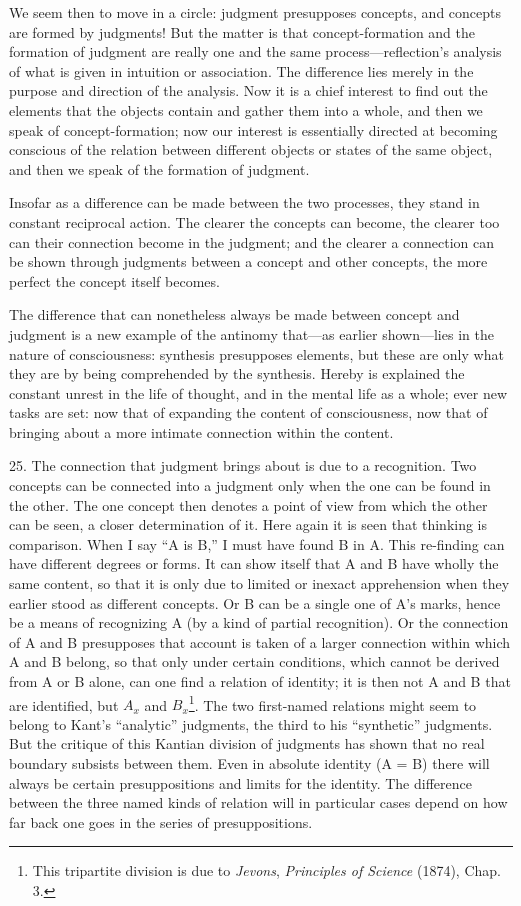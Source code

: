\documentclass[12pt,a4paper]{book}
\newcommand{\opage}[1]{\marginnote{\footnotesize\textit{[#1]}}}
\begin{document}
We seem then to move in a circle: judgment presupposes concepts, and
concepts are formed by judgments! But the matter is that concept-formation
and the formation of judgment are really one and the same
process---reflection's analysis of what is given in intuition or
association. The difference lies merely in the purpose and direction of
the analysis. Now it is a chief interest to find out the elements that
the objects contain and gather them into a whole, and then we speak of
concept-formation; now our interest is essentially directed at becoming
conscious of the relation between different objects or states of the same
object, and then we speak of the formation of judgment.

Insofar as a difference can be made between the two processes, they stand
in constant reciprocal action. The clearer the concepts can become, the
clearer too can their connection become in the judgment; and the clearer
a connection can be shown through judgments between a concept and other
concepts, the more perfect the concept itself becomes.

The difference that can nonetheless always be made between concept and
\opage{73}judgment is a new example of the antinomy that---as earlier shown---lies
in the nature of consciousness: synthesis presupposes elements, but these
are only what they are by being comprehended by the synthesis. Hereby is
explained the constant unrest in the life of thought, and in the mental
life as a whole; ever new tasks are set: now that of expanding the content
of consciousness, now that of bringing about a more intimate connection
within the content.

25. The connection that judgment brings about is due to a recognition.
Two concepts can be connected into a judgment only when the one can be
found in the other. The one concept then denotes a point of view from
which the other can be seen, a closer determination of it. Here again it
is seen that thinking is comparison. When I say ``A is B,'' I must have
found B in A. This re-finding can have different degrees or forms. It can
show itself that A and B have wholly the same content, so that it is only
due to limited or inexact apprehension when they earlier stood as
different concepts. Or B can be a single one of A's marks, hence be a
means of recognizing A (by a kind of partial recognition). Or the
connection of A and B presupposes that account is taken of a larger
connection within which A and B belong, so that only under certain
conditions, which cannot be derived from A or B alone, can one find a
relation of identity; it is then not A and B that are identified, but
$A_x$ and $B_x$\footnote{This tripartite division is due to \emph{Jevons},
\emph{Principles of Science} (1874), Chap. 3.}. The two first-named
relations might seem to belong to Kant's ``analytic'' judgments, the
third to his ``synthetic'' judgments. But the critique of this Kantian
division of judgments has shown that no real boundary subsists between
them. Even in absolute identity (A = B) there will always be certain
presuppositions and limits for the identity. The difference between the
three named kinds of relation will in particular cases depend on how far
back one goes in the series of presuppositions.
\end{document}
